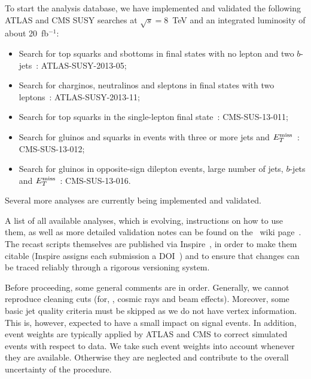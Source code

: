 
To start the analysis database, we have implemented and validated the following ATLAS and CMS SUSY 
searches at $\sqrt{s}=8$~TeV and an integrated luminosity of about 20~fb$^{-1}$: \\

\begin{itemize}
\item Search for top squarks and sbottoms in final states with no lepton and two $b$-jets~\cite{MA5-ATLAS-SUSY-2013-05}: ATLAS-SUSY-2013-05;\\
\item Search for charginos, neutralinos and sleptons in final states with two leptons~\cite{MA5-ATLAS-SUSY-2013-11}: ATLAS-SUSY-2013-11;\\
\end{itemize}

\begin{itemize}
\item Search for top squarks in the single-lepton final state~\cite{Chatrchyan:2013xna}: CMS-SUS-13-011;\\
\item Search for gluinos and squarks in events with three or more jets and $E_T^{\rm miss}$~\cite{Chatrchyan:2014lfa}: CMS-SUS-13-012;\\
\item Search for gluinos in opposite-sign dilepton events, large number of jets, $b$-jets and $E_T^{\rm miss}$~\cite{CMS:2013ija}: CMS-SUS-13-016. \\
\end{itemize}

\noindent 
Several more analyses are currently being implemented and validated.

A list of all available analyses, which is evolving, instructions on how to use them, 
as well as more detailed validation notes can be found on the \ma\ wiki page~\cite{ma5wiki}. 
The recast scripts themselves are published via {\sc Inspire}~\cite{inspire}, in order to make them citable 
({\sc Inspire} assigns each submission a DOI~\cite{doi}) and 
to ensure that changes can be traced reliably through a rigorous versioning system. 

Before proceeding, some general comments are in order. 
Generally, we cannot reproduce cleaning cuts (for, \eg, cosmic rays and beam effects). 
Moreover, some basic jet quality criteria must be skipped as we do not have vertex information. 
This is, however, expected to have a small impact on signal events. 
In addition, event weights are typically applied by ATLAS and CMS to correct simulated events with respect to data. 
We take such event weights into account whenever they are available. 
Otherwise they are neglected and contribute to the overall uncertainty of the procedure.

